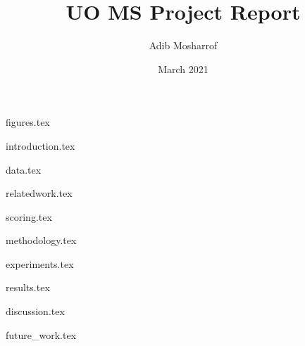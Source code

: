 \documentclass{article}
\title{UO MS Project Report}
\author{Adib Mosharrof}
\date{March 2021}
\begin{document}
\let\oldequation=\equation
\let\endoldequation=\endequation
\renewenvironment{equation}{\vspace{2mm}\begin{oldequation}}{\end{oldequation}\vspace{2mm}}

\maketitle

\newpage
\tableofcontents
\newpage

{figures.tex}

{introduction.tex}

{data.tex}

{relatedwork.tex}

{scoring.tex}

{methodology.tex}

{experiments.tex}

{results.tex}

{discussion.tex}

{future_work.tex}



\end{document}
